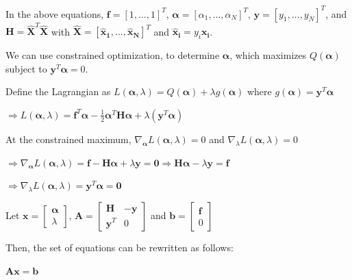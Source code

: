 \documentclass[fleqn]{article}
\begin{document}
\begin{enumerate}
\begin{enumerate}
		In the above equations, $\mathbf{f} = [1, ..., 1]^T$, $\boldsymbol{\alpha} = [\alpha_1, ..., \alpha_N]^T$, \newline $\mathbf{y} = [y_1,...,y_N]^T$, and $\mathbf{H} = \mathbf{\hat{X}}^T\mathbf{\hat{X}}$ with $\mathbf{\hat{X}} = [\mathbf{\hat{x}_1}, ..., \mathbf{\hat{x}_N}]^T$ \newline and $\mathbf{\hat{x}_i} = y_i\mathbf{x_i}$.

		We can use constrained optimization, to determine $\boldsymbol{\alpha}$, which \newline maximizes $Q(\boldsymbol{\alpha})$ subject to $\mathbf{y}^T\boldsymbol{\alpha} = 0$.
		
		Define the Lagrangian as $L(\boldsymbol{\alpha},\lambda) = Q(\boldsymbol{\alpha}) + \lambda g(\boldsymbol{\alpha})$ where $g(\boldsymbol{\alpha}) = \mathbf{y}^T\boldsymbol{\alpha}$
		
		$\Rightarrow L(\boldsymbol{\alpha},\lambda) = \mathbf{f}^T\boldsymbol{\alpha} - \frac{1}{2}\boldsymbol{\alpha}^T\mathbf{H}\boldsymbol{\alpha} + \lambda(\mathbf{y}^T\boldsymbol{\alpha})$
		
		At the constrained maximum, $\nabla_{\boldsymbol{\alpha}}L(\boldsymbol{\alpha},\lambda) = 0$ and $\nabla_{\lambda}L(\boldsymbol{\alpha},\lambda) = 0$ 
		
		$\Rightarrow \nabla_{\boldsymbol{\alpha}}L(\boldsymbol{\alpha},\lambda) = \mathbf{f} - \mathbf{H}\boldsymbol{\alpha} + \lambda\mathbf{y} = \mathbf{0} \Rightarrow \mathbf{H}\boldsymbol{\alpha} - \lambda\mathbf{y} = \mathbf{f}$
		
		$\Rightarrow \nabla_{\lambda}L(\boldsymbol{\alpha},\lambda) = \mathbf{y}^T\boldsymbol{\alpha} = \mathbf{0}$
		
		Let $\mathbf{x} = \begin{bmatrix} \boldsymbol{\alpha}\\ \lambda \end{bmatrix}$, $\mathbf{A} = \begin{bmatrix} \mathbf{H} & -\mathbf{y}\\ \mathbf{y}^T & 0 \end{bmatrix}$ and $\mathbf{b} = \begin{bmatrix} \mathbf{f} \\ 0\end{bmatrix}$
		
		Then, the set of equations can be rewritten as follows:
		
		$\mathbf{A}\mathbf{x} = \mathbf{b}$
		

\end{enumerate}
\end{enumerate}
\end{document}
